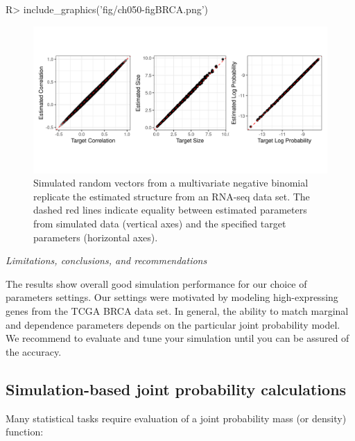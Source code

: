 \documentclass[
]{jss}
\begin{document}
\begin{CodeChunk}
\begin{CodeInput}
R> include_graphics('fig/ch050-figBRCA.png')
\end{CodeInput}
\begin{figure}

{\centering \includegraphics[width=0.8\linewidth]{fig/ch050-figBRCA} 

}

\caption[Simulated random vectors from a multivariate negative binomial replicate the estimated structure from an RNA-seq data set]{Simulated random vectors from a multivariate negative binomial replicate the estimated structure from an RNA-seq data set. The dashed red lines indicate equality between estimated parameters from simulated data (vertical axes) and the specified target parameters (horizontal axes).}\label{fig:ch050-figBRCA}
\end{figure}
\end{CodeChunk}

\emph{Limitations, conclusions, and recommendations}

The results show overall good simulation performance for our choice of parameters settings. Our settings were motivated by modeling high-expressing genes from the TCGA BRCA data set. In general, the ability to match marginal and dependence parameters depends on the particular joint probability model. We recommend to evaluate and tune your simulation until you can be assured of the accuracy.

\hypertarget{simulation-based-joint-probability-calculations}{%
\subsection{Simulation-based joint probability calculations}\label{simulation-based-joint-probability-calculations}}

Many statistical tasks require evaluation of a joint probability mass (or density) function:
\end{document}
